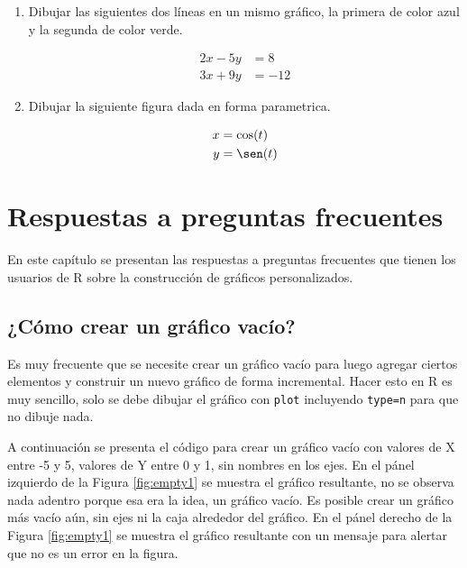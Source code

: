 \documentclass[10pt,]{krantz}
\providecommand{\tightlist}{%
  \setlength{\itemsep}{0pt}\setlength{\parskip}{0pt}}
\let\proglang=\textsf
\begin{document}
\begin{enumerate}
\def\labelenumi{\arabic{enumi}.}
\setcounter{enumi}{3}
\tightlist
\item
  Dibujar las siguientes dos líneas en un mismo gráfico, la primera de
  color azul y la segunda de color verde.

  \begin{align*} 
  2x - 5y &=  8 \\ 
  3x + 9y &=  -12
  \end{align*}
\item
  Dibujar la siguiente figura dada en forma parametrica.

  \begin{align*} 
  x &=  \cos(t) \\ 
  y &=  \sen(t)
  \end{align*}
\end{enumerate}

\chapter{Respuestas a preguntas
frecuentes}\label{respuestas-a-preguntas-frecuentes}

En este capítulo se presentan las respuestas a preguntas frecuentes que
tienen los usuarios de \proglang{R} sobre la construcción de gráficos
personalizados.

\section{\texorpdfstring{¿Cómo crear un gráfico vacío?
\label{emptygraph}}{¿Cómo crear un gráfico vacío? }}\label{como-crear-un-grafico-vacio}

Es muy frecuente que se necesite crear un gráfico vacío para luego
agregar ciertos elementos y construir un nuevo gráfico de forma
incremental. Hacer esto en \proglang{R} es muy sencillo, solo se debe
dibujar el gráfico con \texttt{plot} incluyendo
\texttt{type=\textquotesingle{}n\textquotesingle{}} para que no dibuje
nada.

A continuación se presenta el código para crear un gráfico vacío con
valores de X entre -5 y 5, valores de Y entre 0 y 1, sin nombres en los
ejes. En el pánel izquierdo de la Figura \ref{fig:empty1} se muestra el
gráfico resultante, no se observa nada adentro porque esa era la idea,
un gráfico vacío. Es posible crear un gráfico más vacío aún, sin ejes ni
la caja alrededor del gráfico. En el pánel derecho de la Figura
\ref{fig:empty1} se muestra el gráfico resultante con un mensaje para
alertar que no es un error en la figura.
\end{document}
